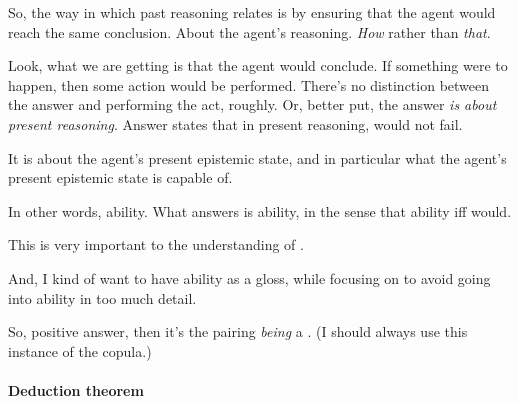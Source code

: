 \begin{note}
  So, the way in which past reasoning relates is by ensuring that the agent would reach the same conclusion.
  About the agent's reasoning.
  \emph{How} rather than \emph{that}.

  Look, what we are getting is that the agent would conclude.
  If something were to happen, then some action would be performed.
  There's no distinction between the answer and performing the act, roughly.
  Or, better put, the answer \emph{is about present reasoning}.
  Answer states that in present reasoning, would not fail.


  It is about the agent's present epistemic state, and in particular what the agent's present epistemic state is capable of.

  In other words, ability.
  What answers is ability, in the sense that ability iff would.

  This is very important to the understanding of \fc{}.

  And, I kind of want to have ability as a gloss, while focusing on \fc{} to avoid going into ability in too much detail.

  So, positive answer, then it's the pairing \emph{being} a \fc{}.
  (I should always use this instance of the copula.)
\end{note}

\paragraph{Deduction theorem}

